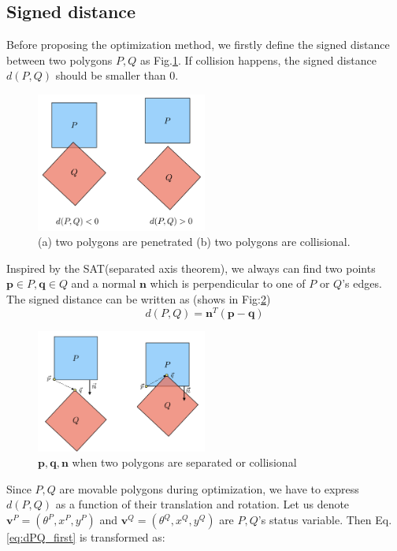 \documentclass[12pt]{article}
\newcommand{\bn}{\mathbf{n}}
\newcommand{\bq}{\mathbf{q}}
\newcommand{\bp}{\mathbf{p}}
\newcommand{\bv}{\mathbf{v}}
\begin{document}
\subsection{Signed distance}
Before proposing the optimization method, we firstly define the signed distance between two polygons $P, Q$ as Fig.\ref{fig:signed_distance}. If collision happens, the signed distance $d(P, Q)$ should be smaller than $0$.\par
\begin{figure}[!htbp]
  \centering
    \includegraphics[width=0.5\textwidth]{ppt/signed_distance.png}
      \caption{(a) two polygons are penetrated (b) two polygons are collisional.}
      \label{fig:signed_distance}
\end{figure}
Inspired by the SAT(separated axis theorem), we always can find two points $\bp \in P, \bq \in Q$ and a normal $\bn$ which is perpendicular to one of $P$ or $Q$'s edges. The signed distance can be written as (shows in Fig:\ref{fig:distance_calculation})
\begin{equation}
	d(P, Q) = \bn^T(\bp - \bq)
	\label{eq:dPQ_first}
\end{equation}\par
\begin{figure}[!htbp]
  \centering
    \includegraphics[width=0.5\textwidth]{ppt/distance_calculation.png}
      \caption{$\bp, \bq, \bn$ when two polygons are separated or collisional}
      \label{fig:distance_calculation}
\end{figure}
Since $P, Q$ are movable polygons during optimization, we have to express $d(P, Q)$ as a function of their translation and rotation. Let us denote $\bv^P = (\theta^P, x^P, y^P)$ and $\bv^Q = (\theta^Q, x^Q, y^Q)$ are $P, Q$'s status variable. Then Eq.\ref{eq:dPQ_first} is transformed as:
\end{document}
